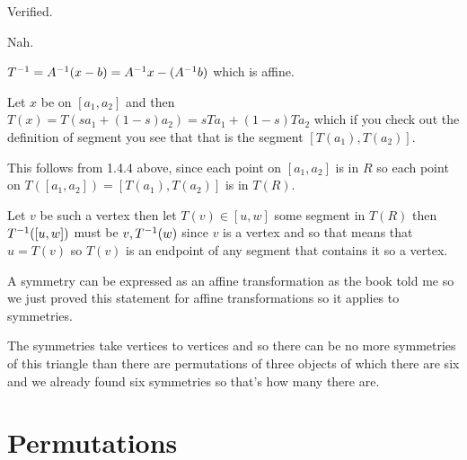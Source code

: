 \documentclass[11pt, oneside]{article}   	%
\begin{document}
\be
\item Verified.
\item Nah.
\item $T^{-1} = A^{-1}(x-b) = A^{-1} x - (A^{-1} b)$ which is affine.
\item Let $x$ be on $[a_1, a_2]$ and then $T(x) = T(sa_1 + (1-s)a_2) = sTa_1 + (1-s)Ta_2$ which if you check out the definition of segment you see that that is the segment $[T(a_1), T(a_2)]$.
\item This follows from 1.4.4 above, since each point on $[a_1, a_2]$ is in $R$ so each point on $T([a_1, a_2]) = [T(a_1), T(a_2)]$ is in $T(R)$.
\item Let $v$ be such a vertex then let $T(v) \in [u, w]$ some segment in $T(R)$ then $T^{-1}([u, w])$ must be $v, T^{-1}(w)$ since $v$ is a vertex and so that means that $u=T(v)$ so $T(v)$ is an endpoint of any segment that contains it so a vertex.
\item A symmetry can be expressed as an affine transformation as the book told me so we just proved this statement for affine transformations so it applies to symmetries.
\item The symmetries take vertices to vertices and so there can be no more symmetries of this triangle than there are permutations of three objects of which there are six and we already found six symmetries so that's how many there are.
\ee

\section{Permutations}
\end{document}
